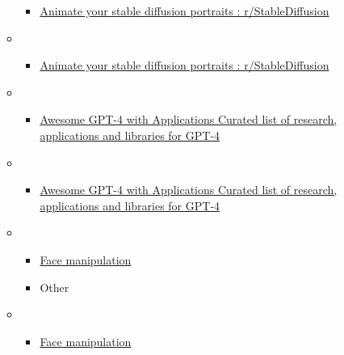 \begin{itemize}
\begin{itemize}
\begin{itemize}
    \item
      \href{https://www.reddit.com/r/StableDiffusion/comments/11qexu0/animate_your_stable_diffusion_portraits/\#}{Animate
      your stable diffusion portraits : r/StableDiffusion}
    \end{itemize}
  \item
    \begin{itemize}
     
    \item
      \href{https://www.reddit.com/r/StableDiffusion/comments/11qexu0/animate_your_stable_diffusion_portraits/\#}{Animate
      your stable diffusion portraits : r/StableDiffusion}
    \end{itemize}
  \item
    \begin{itemize}
     
    \item
      \href{https://github.com/dk-liang/Awesome-GPT-4-with-Applications}{Awesome
      GPT-4 with Applications \textbar{} Curated list of research,
      applications and libraries for GPT-4}
    \end{itemize}
  \item
    \begin{itemize}
     
    \item
      \href{https://github.com/dk-liang/Awesome-GPT-4-with-Applications}{Awesome
      GPT-4 with Applications \textbar{} Curated list of research,
      applications and libraries for GPT-4}
    \end{itemize}
  \item
    \begin{itemize}
     
    \item
      \href{https://buff.ly/3laNpgY}{Face manipulation}
    \end{itemize}

    \begin{itemize}
     
    \item
      Other
    \end{itemize}
  \item
    \begin{itemize}
     
    \item
      \href{https://buff.ly/3laNpgY}{Face manipulation}
    \end{itemize}

    \begin{itemize}
     

\end{itemize}
\end{itemize}
\end{itemize}
